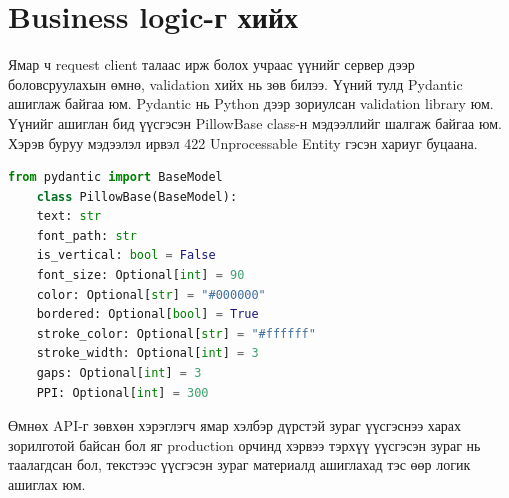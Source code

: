 \section{Business logic-г хийх}
Ямар ч request client талаас ирж болох учраас үүнийг сервер дээр боловсруулахын өмнө, validation хийх нь зөв билээ. Үүний тулд Pydantic ашиглаж байгаа юм. Pydantic нь Python дээр зориулсан validation library юм. Үүнийг ашиглан бид үүсгэсэн PillowBase class-н мэдээллийг шалгаж байгаа юм. Хэрэв буруу мэдээлэл ирвэл 422 Unprocessable Entity гэсэн хариуг буцаана.
\begin{lstlisting}[language=Python,caption={Pydantic Validator},frame=single]
	from pydantic import BaseModel
	class PillowBase(BaseModel):
    text: str
    font_path: str
    is_vertical: bool = False
    font_size: Optional[int] = 90
    color: Optional[str] = "#000000"
    bordered: Optional[bool] = True
    stroke_color: Optional[str] = "#ffffff"
    stroke_width: Optional[int] = 3
    gaps: Optional[int] = 3
    PPI: Optional[int] = 300
\end{lstlisting}

Өмнөх API-г зөвхөн хэрэглэгч ямар хэлбэр дүрстэй зураг үүсгэснээ харах зорилготой байсан бол яг production орчинд хэрвээ тэрхүү үүсгэсэн зураг нь таалагдсан бол, текстээс үүсгэсэн зураг материалд ашиглахад тэс өөр логик ашиглах юм.

